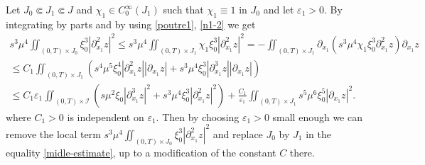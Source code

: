 \documentclass[a4paper, 12pt]{article}
\theoremstyle{plain}
\theoremstyle{definition}
\numberwithin{theorem}{section}
\numberwithin{equation}{section}
\begin{document}
{Let $J_0\Subset J_1\Subset J$ and $\chi_1\in C_0^\infty(J_1)$ such that $\chi_1\equiv 1$ in $J_0$ and let $\varepsilon_1>0$. By integrating by parts and by using \eqref{poutre1}, \eqref{n1-2} we get 
\begin{multline*}
    s^3\mu^4 \iint_{(0,T)\times J_0}\xi_0^3|\partial_{x_1}^2z|^2\leq s^3\mu^4 \iint_{(0,T)\times J_1}\chi_1\xi_0^3|\partial_{x_1}^2 z|^2= - \iint_{(0,T)\times J_1}\partial_{x_1}(s^3\mu^4\chi_1\xi_0^3\partial_{x_1}^2 z) \partial_{x_1}z\\
    \leq C_1 \iint_{(0,T)\times J_1}(s^4\mu^5\xi_0^4|\partial_{x_1}^2 z||\partial_{x_1} z|+s^3\mu^4\xi_0^3|\partial_{x_1}^3 z||\partial_{x_1} z|) \\
    \leq C_1 \varepsilon_1 \iint_{(0,T)\times \mathcal{I}}(s\mu^2\xi_0|\partial_{x_1}^3 z|^2
    +s^3\mu^4\xi_0^3|\partial_{x_1}^2 z|^2)+\frac{C_1}{\varepsilon_1}\iint_{(0,T)\times J_1}s^5\mu^6\xi_0^5|\partial_{x_1} z|^2.
\end{multline*}
where $C_1>0$ is independent on $\varepsilon_1$. Then by choosing $\varepsilon_1>0$ small enough we can remove the local term $s^3\mu^4 \iint_{(0,T)\times J_0}\xi_0^3|\partial_{x_1}^2z|^2$ and replace $J_0$ by $J_1$ in the equality \eqref{midle-estimate}, up to a modification of the constant $C$ there. 

}
\end{document}
